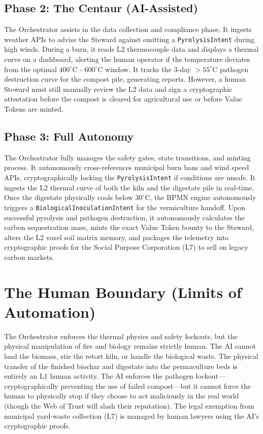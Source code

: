 \subsection{Phase 2: The Centaur (AI-Assisted)}
The Orchestrator assists in the data collection and compliance phase. It ingests weather APIs to advise the Steward against emitting a \texttt{PyrolysisIntent} during high winds. During a burn, it reads L2 thermocouple data and displays a thermal curve on a dashboard, alerting the human operator if the temperature deviates from the optimal $400^\circ\text{C}$ - $600^\circ\text{C}$ window. It tracks the 3-day $>55^\circ\text{C}$ pathogen destruction curve for the compost pile, generating reports. However, a human Steward must still manually review the L2 data and sign a cryptographic attestation before the compost is cleared for agricultural use or before Value Tokens are minted.

\subsection{Phase 3: Full Autonomy}
The Orchestrator fully manages the safety gates, state transitions, and minting process. It autonomously cross-references municipal burn bans and wind speed APIs, cryptographically locking the \texttt{PyrolysisIntent} if conditions are unsafe. It ingests the L2 thermal curve of both the kiln and the digestate pile in real-time. Once the digestate physically cools below $30^\circ\text{C}$, the BPMN engine autonomously triggers a \texttt{BiologicalInoculationIntent} for the vermiculture handoff. Upon successful pyrolysis and pathogen destruction, it autonomously calculates the carbon sequestration mass, mints the exact Value Token bounty to the Steward, alters the L2 voxel soil matrix memory, and packages the telemetry into cryptographic proofs for the Social Purpose Corporation (L7) to sell on legacy carbon markets.

\section{The Human Boundary (Limits of Automation)}
The Orchestrator enforces the thermal physics and safety lockouts, but the physical manipulation of fire and biology remains strictly human. The AI cannot load the biomass, stir the retort kiln, or handle the biological waste. The physical transfer of the finished biochar and digestate into the permaculture beds is entirely an L1 human activity. The AI enforces the pathogen lockout---cryptographically preventing the use of failed compost---but it cannot force the human to physically stop if they choose to act maliciously in the real world (though the Web of Trust will slash their reputation). The legal exemption from municipal yard-waste collection (L7) is managed by human lawyers using the AI's cryptographic proofs.

